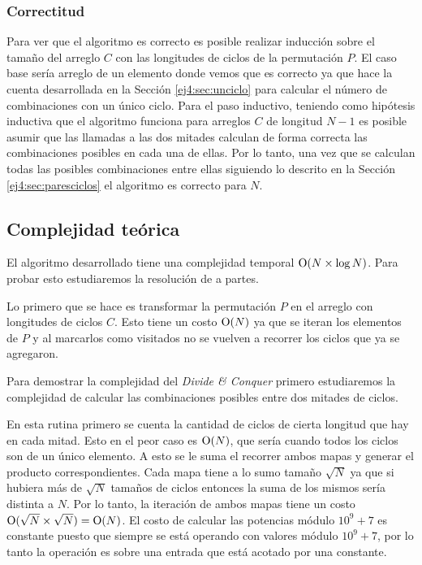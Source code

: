 \subsubsection{Correctitud}

Para ver que el algoritmo es correcto es posible realizar inducción sobre el
tamaño del arreglo $C$ con las longitudes de ciclos de la permutación $P$. El
caso base sería arreglo de un elemento donde vemos que es correcto ya que hace
la cuenta desarrollada en la Sección \ref{ej4:sec:unciclo} para calcular el
número de combinaciones con un único ciclo. Para el paso inductivo, teniendo
como hipótesis inductiva que el algoritmo funciona para arreglos $C$ de longitud
$N - 1$ es posible asumir que las llamadas a las dos mitades calculan de forma
correcta las combinaciones posibles en cada una de ellas. Por lo tanto, una vez
que se calculan todas las posibles combinaciones entre ellas siguiendo lo
descrito en la Sección \ref{ej4:sec:paresciclos} el algoritmo es correcto para
$N$.

\subsection{Complejidad teórica}

El algoritmo desarrollado tiene una complejidad temporal $\operatorname{O}(N \times \log
N)$. Para probar esto estudiaremos la resolución de a partes.

Lo primero que se hace es transformar la permutación $P$ en el arreglo con
longitudes de ciclos $C$. Esto tiene un costo $\operatorname{O}(N)$ ya que se iteran los
elementos de $P$ y al marcarlos como visitados no se vuelven a recorrer los
ciclos que ya se agregaron.

Para demostrar la complejidad del \emph{Divide \& Conquer} primero estudiaremos
la complejidad de calcular las combinaciones posibles entre dos mitades de
ciclos.

En esta rutina primero se cuenta la cantidad de ciclos de cierta
longitud que hay en cada mitad. Esto en el peor caso es $\operatorname{O}(N)$, que sería
cuando todos los ciclos son de un único elemento. A esto se le suma el recorrer
ambos mapas y generar el producto correspondientes. Cada mapa tiene a lo sumo
tamaño $\sqrt{N}$ ya que si hubiera más de $\sqrt{N}$ tamaños de ciclos entonces
la suma de los mismos sería distinta a $N$. Por lo tanto, la iteración de ambos
mapas tiene un costo $\operatorname{O}(\sqrt{N} \times \sqrt{N}) = \operatorname{O}(N)$. El costo de
calcular las potencias módulo $10^9 + 7$ es constante puesto que siempre se está
operando con valores módulo $10^9 + 7$, por lo tanto la operación es sobre una
entrada que está acotado por una constante.

